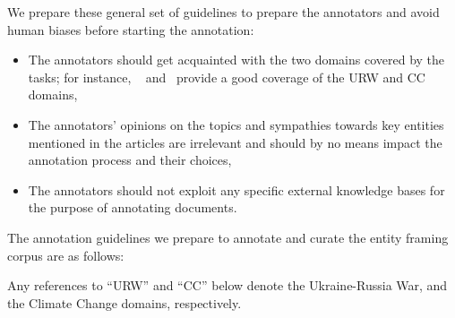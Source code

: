 We prepare these general set of guidelines to prepare the annotators and avoid human biases before starting the annotation:

\begin{itemize}
    \item The annotators should get acquainted with the two domains covered by the tasks; for instance, ~\cite{kremlin-propaganda} and~\cite{cc-denial-tax} provide a good coverage of the URW and CC domains,
    \item The annotators' opinions on the topics and sympathies towards key entities mentioned in the articles are irrelevant and should by no means impact the annotation process and their choices, 
    \item The annotators should not exploit any specific external knowledge bases for the purpose of annotating documents.
\end{itemize}

The annotation guidelines we prepare to annotate and curate the entity framing corpus are as follows:

Any references to ``URW'' and ``CC'' below denote the Ukraine-Russia War, and the Climate Change domains, respectively.


